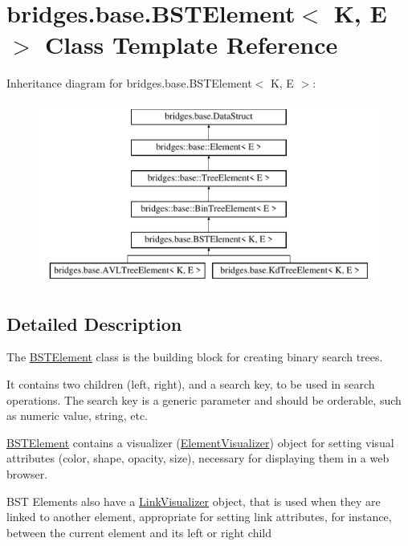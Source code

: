 \hypertarget{classbridges_1_1base_1_1_b_s_t_element}{}\section{bridges.\+base.\+B\+S\+T\+Element$<$ K, E $>$ Class Template Reference}
\label{classbridges_1_1base_1_1_b_s_t_element}
Inheritance diagram for bridges.\+base.\+B\+S\+T\+Element$<$ K, E $>$\+:\begin{figure}[H]
\begin{center}
\leavevmode
\includegraphics[height=6.000000cm]{classbridges_1_1base_1_1_b_s_t_element}
\end{center}
\end{figure}


\subsection{Detailed Description}
The \hyperlink{classbridges_1_1base_1_1_b_s_t_element}{B\+S\+T\+Element} class is the building block for creating binary search trees. 

It contains two children (left, right), and a search key, to be used in search operations. The search key is a generic parameter and should be orderable, such as numeric value, string, etc.

\hyperlink{classbridges_1_1base_1_1_b_s_t_element}{B\+S\+T\+Element} contains a visualizer (\hyperlink{classbridges_1_1base_1_1_element_visualizer}{Element\+Visualizer}) object for setting visual attributes (color, shape, opacity, size), necessary for displaying them in a web browser.

B\+ST Elements also have a \hyperlink{classbridges_1_1base_1_1_link_visualizer}{Link\+Visualizer} object, that is used when they are linked to another element, appropriate for setting link attributes, for instance, between the current element and its left or right child

